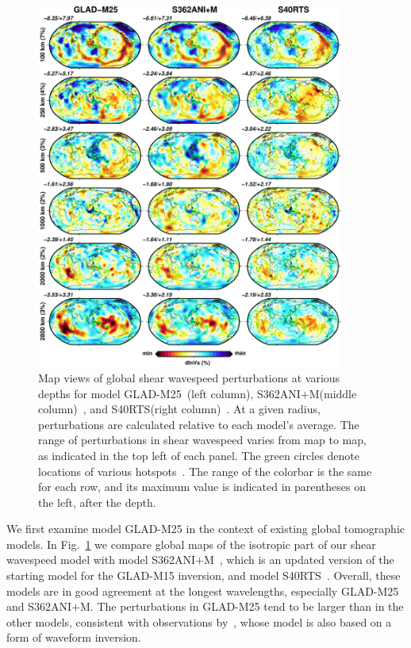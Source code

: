 \begin{figure}
  \centering
  \includegraphics[width=0.9\textwidth]{ch-GLADM25/figures/depth_slice/globe_vs.pdf}
  \caption{\small{Map views of global shear wavespeed perturbations at various depths for  model
  GLAD-M25~(left column), S362ANI$+$M(middle column)~\cite{moulik2014anisotropic},
  and S40RTS(right column)~\cite{ritsema2011s40rts}.
  At a given radius,
  perturbations are calculated relative to each model's average.
  The range of perturbations in shear wavespeed varies from map to map, as indicated in the top left of each panel.
  The green circles denote locations of various
  hotspots~\cite{montelli2006catalogue}.
  The range of the colorbar is the same for each row,
  and its maximum value is indicated in parentheses on the left, after
  the depth.}}
  \label{fig:global-vs}
\end{figure}

We first examine model GLAD-M25 in the context of existing global tomographic models.
In Fig.~\ref{fig:global-vs} we compare global maps of the isotropic part of our
shear wavespeed model with model S362ANI$+$M~\cite{moulik2014anisotropic},
which is an updated version of the starting model for the GLAD-M15 inversion,
and model S40RTS~\cite{ritsema2011s40rts}.
Overall, these models are in good agreement
at the longest wavelengths, especially GLAD-M25 and S362ANI$+$M.
The perturbations in GLAD-M25 tend to be larger than in the other models,
consistent with observations by~\cite{french2014whole},
whose model is also based on a form of waveform inversion.

